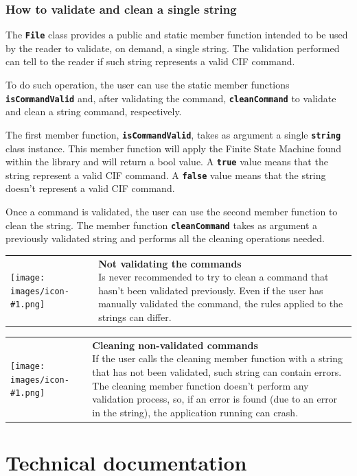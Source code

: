 \documentclass[11pt,twoside,openany,x11names,svgnames]{memoir}
\makeatletter
\newcommand\chapterillustration{}
\newcommand{\IconNote}[3]
{
	\begin{table}[ht]
	\begin{tabular}{ lm{\dimexpr\textwidth-8\tabcolsep-\wd0}@{}}
		\toprule
		\texttt{[image: images/icon-\#1.png]}
		&
		\parbox[t]{155mm}{
		\textbf{#2} \\
		#3
		}
	\end{tabular}
\end{table}
}
\makeatother
\begin{document}
\subsection{How to validate and clean a single string}

The \textbf{\texttt{File}} class provides a public and static member function intended to be used by the reader to validate, on demand, a single string. The validation performed can tell to the reader if such string represents a valid CIF command.

To do such operation, the user can use the static member functions \textbf{\texttt{isCommandValid}} and, after validating the command, \textbf{\texttt{cleanCommand}} to validate and clean a string command, respectively.

The first member function, \textbf{\texttt{isCommandValid}}, takes as argument a single \textbf{\texttt{string}} class instance. This member function will apply the Finite State Machine found within the library and will return a bool value. A \textbf{\texttt{true}} value means that the string represent a valid CIF command. A \textbf{\texttt{false}} value means that the string doesn't represent a valid CIF command.

Once a command is validated, the user can use the second member function to clean the string. The member function \textbf{\texttt{cleanCommand}} takes as argument a previously validated string and performs all the cleaning operations needed.

\IconNote
	{warning}
	{Not validating the commands}
	{Is never recommended to try to clean a command that hasn't been validated previously. Even if the user has manually validated the command, the rules applied to the strings can differ.}
	
\IconNote
	{error}
	{Cleaning non-validated commands}
	{If the user calls the cleaning member function with a string that has not been validated, such string can contain errors. The cleaning member function doesn't perform any validation process, so, if an error is found (due to an error in the string), the application running can crash.}

\renewcommand\chapterillustration{images/chapter03-cover}
\chapter{Technical documentation}\label{Technical-documentation}
\end{document}
